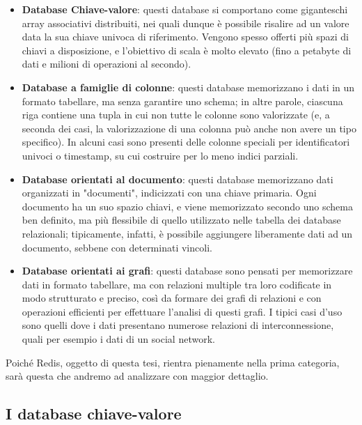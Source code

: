\begin{itemize}
	\medskip
	\item
	\textbf{Database Chiave-valore}: questi database si comportano come giganteschi array
	associativi distribuiti, nei quali dunque è possibile risalire ad un valore data la
	sua chiave univoca di riferimento. Vengono spesso offerti più spazi di chiavi
	a disposizione, e l'obiettivo di scala è molto elevato (fino a petabyte di dati
	e milioni di operazioni al secondo).

	\item
	\textbf{Database a famiglie di colonne}: questi database memorizzano i dati in un formato
	tabellare, ma senza garantire uno schema; in altre parole, ciascuna riga contiene
	una tupla in cui non tutte le colonne sono valorizzate (e, a seconda dei casi, la
	valorizzazione di una colonna può anche non avere un tipo specifico). In alcuni
	casi sono presenti delle colonne speciali per identificatori univoci o timestamp,
	su cui costruire per lo meno indici parziali.

	\item
	\textbf{Database orientati al documento}: questi database memorizzano dati organizzati in
	"documenti", indicizzati con una chiave primaria. Ogni documento ha un suo spazio
	chiavi, e viene memorizzato secondo uno schema ben definito, ma più flessibile
	di quello utilizzato nelle tabella dei database relazionali; tipicamente, infatti,
	è possibile aggiungere liberamente dati ad un documento, sebbene con determinati
	vincoli.

	\item
	\textbf{Database orientati ai grafi}: questi database sono pensati per memorizzare dati
	in formato tabellare, ma con relazioni multiple tra loro codificate in modo
	strutturato e preciso, così da formare dei grafi di relazioni e con operazioni
	efficienti per effettuare l'analisi di questi grafi. I tipici casi d'uso sono
	quelli dove i dati presentano numerose relazioni di interconnessione, quali per
	esempio i dati di un social network.
\end{itemize}

Poiché Redis, oggetto di questa tesi, rientra pienamente nella prima categoria, sarà
questa che andremo ad analizzare con maggior dettaglio.


\subsection{I database chiave-valore}

